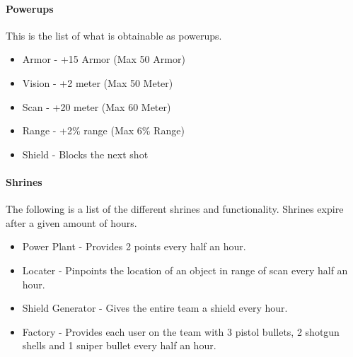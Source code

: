 \paragraph{Powerups}
This is the list of what is obtainable as powerups.
\begin{itemize}
\item Armor - +15 Armor (Max 50 Armor)
\item Vision - +2 meter (Max 50 Meter)
\item Scan - +20 meter (Max 60 Meter)
\item Range - +2\% range (Max 6\% Range)
\item Shield - Blocks the next shot
\end{itemize}

\paragraph{Shrines}
The following is a list of the different shrines and functionality. Shrines expire after a given amount of hours.
\begin{itemize}
\item Power Plant - Provides 2 points every half an hour.
\item Locater - Pinpoints the location of an object in range of scan every half an hour.
\item Shield Generator - Gives the entire team a shield every hour.
\item Factory - Provides each user on the team with 3 pistol bullets, 2 shotgun shells and 1 sniper bullet every half an hour.
\end{itemize}

